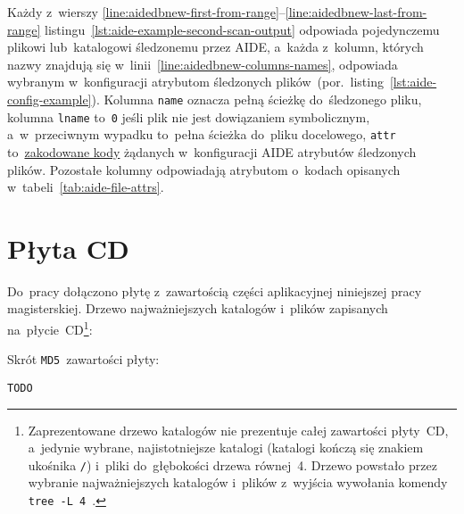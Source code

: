 \documentclass[thesis]{subfiles}
\begin{document}
\begin{appendices}
Każdy z~wierszy \ref{line:aidedbnew-first-from-range}--\ref{line:aidedbnew-last-from-range} listingu~\ref{lst:aide-example-second-scan-output} odpowiada pojedynczemu plikowi lub~katalogowi śledzonemu przez AIDE, a~każda z~kolumn, których nazwy znajdują się w~linii~\ref{line:aidedbnew-columns-names}, odpowiada wybranym w~konfiguracji atrybutom śledzonych plików~(por.~listing~\ref{lst:aide-config-example}). Kolumna \texttt{name} oznacza pełną ścieżkę do~śledzonego pliku, kolumna \texttt{lname} to~\texttt{0} jeśli plik nie jest dowiązaniem symbolicznym, a~w~przeciwnym wypadku to~pełna ścieżka do~pliku docelowego, \texttt{attr} to~\href{https://unix.stackexchange.com/questions/342693/understanding-aide-db/343020}{zakodowane kody} żądanych w~konfiguracji AIDE atrybutów śledzonych plików. Pozostałe kolumny odpowiadają atrybutom o~kodach opisanych w~tabeli~\ref{tab:aide-file-attrs}.



\chapter{Płyta CD}
\label{ch:cd-appendix}

Do~pracy dołączono płytę z~zawartością części aplikacyjnej niniejszej pracy magisterskiej. Drzewo najważniejszych katalogów i~plików zapisanych na~płycie~CD\footnote{Zaprezentowane drzewo katalogów nie prezentuje całej zawartości płyty~CD, a~jedynie wybrane, najistotniejsze katalogi (katalogi kończą się znakiem ukośnika \texttt{/}) i~pliki do~głębokości drzewa równej~4. Drzewo powstało przez wybranie najważniejszych katalogów i~plików z~wyjścia wywołania komendy \mbox{\texttt{tree~-L~4}}~\cite{tree-manual}.}:

{\footnotesize
{}
}

\noindent Skrót \texttt{MD5}~zawartości płyty:\mynobreakpar
\begin{center}
\texttt{TODO}
\end{center}



\end{appendices}
\end{document}
